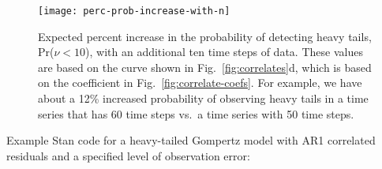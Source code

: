 \begin{figure}[htbp]
\begin{center}
\texttt{[image: perc-prob-increase-with-n]}
\caption{
Expected percent increase in the probability of detecting heavy tails, Pr($\nu < 10$), with an additional ten time steps of data.
These values are based on the curve shown in Fig.~\ref{fig:correlates}d, which is based on the coefficient in Fig.~\ref{fig:correlate-coefs}.
For example, we have about a 12\% increased probability of observing heavy tails in a time series that has 60 time steps vs.\ a time series with 50 time steps.
}
\label{fig:perc-inc-p}
\end{center}
\end{figure}

%

\clearpage

\noindent
Example Stan code for a heavy-tailed Gompertz model with AR1 correlated residuals and a specified level of observation error:


